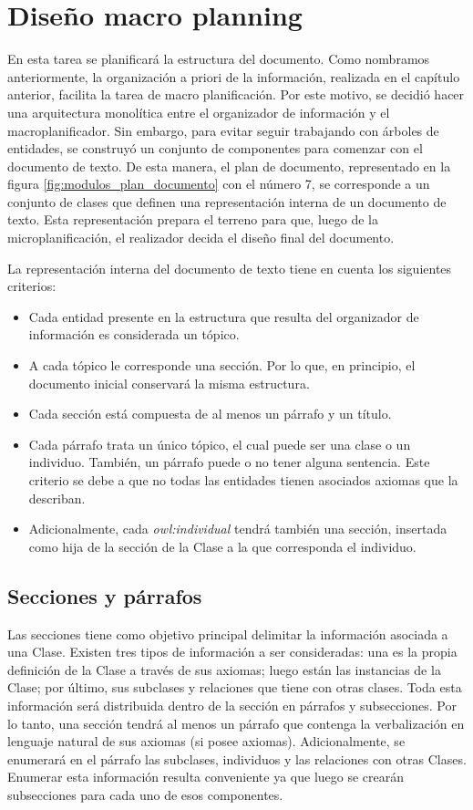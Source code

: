 \section{Diseño macro planning}
En esta tarea se planificará la estructura del documento. Como nombramos anteriormente, la organización a priori de la información, realizada en el capítulo anterior, facilita la tarea de macro planificación. Por este motivo, se decidió hacer una arquitectura monolítica entre el organizador de información y el macroplanificador. Sin embargo, para evitar seguir trabajando con árboles de entidades, se construyó un conjunto de componentes para comenzar con el documento de texto. De esta manera, el plan de documento, representado en la figura \ref{fig:modulos_plan_documento} con el número 7, se corresponde a un conjunto de clases que definen una representación interna de un documento de texto. Esta representación prepara el terreno para que, luego de la microplanificación, el realizador decida el diseño final del documento.

La representación interna del documento de texto tiene en cuenta los siguientes criterios:
\begin{itemize}
    \item Cada entidad presente en la estructura que resulta del organizador de información es considerada un tópico. 
    \item A cada tópico le corresponde una sección. Por lo que, en principio, el documento inicial conservará la misma estructura.
    \item Cada sección está compuesta de al menos un párrafo y un título.
    \item Cada párrafo trata un único tópico, el cual puede ser una clase o un individuo. También, un párrafo puede o no tener alguna sentencia. Este criterio se debe a que no todas las entidades tienen asociados axiomas que la describan.
    \item Adicionalmente, cada \emph{owl:individual} tendrá también una sección, insertada como hija de la sección de la Clase a la que corresponda el individuo.
\end{itemize}

\subsection{Secciones y párrafos}
Las secciones tiene como objetivo principal delimitar la información asociada a una Clase. Existen tres tipos de información a ser consideradas: una es la propia definición de la Clase a través de sus axiomas; luego están las instancias de la Clase; por último, sus subclases y relaciones que tiene con otras clases. Toda esta información será distribuida dentro de la sección en párrafos y subsecciones. Por lo tanto, una sección tendrá al menos un párrafo que contenga la verbalización en lenguaje natural de sus axiomas (si posee axiomas). Adicionalmente, se enumerará en el párrafo las subclases, individuos y las relaciones con otras Clases. Enumerar esta información resulta conveniente ya que luego se crearán subsecciones para cada uno de esos componentes.

